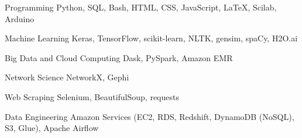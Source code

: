 

\begin{cvskills}

  \cvskill
    {Programming} %
    {Python, SQL, Bash, HTML, CSS, JavaScript, LaTeX, Scilab, Arduino} %


  \cvskill
    {Machine Learning} %
    {Keras, TensorFlow, scikit-learn, NLTK, gensim, spaCy, H2O.ai} %
    
  \cvskill
    {Big Data and Cloud Computing} %
    {Dask, PySpark, Amazon EMR} %
    
  \cvskill
    {Network Science} %
    {NetworkX, Gephi} %
    
  \cvskill
    {Web Scraping} %
    {Selenium, BeautifulSoup, requests} %
    
  \cvskill
    {Data Engineering} %
    {Amazon Services (EC2, RDS, Redshift, DynamoDB (NoSQL), S3, Glue), Apache Airflow} %
    
\end{cvskills}
